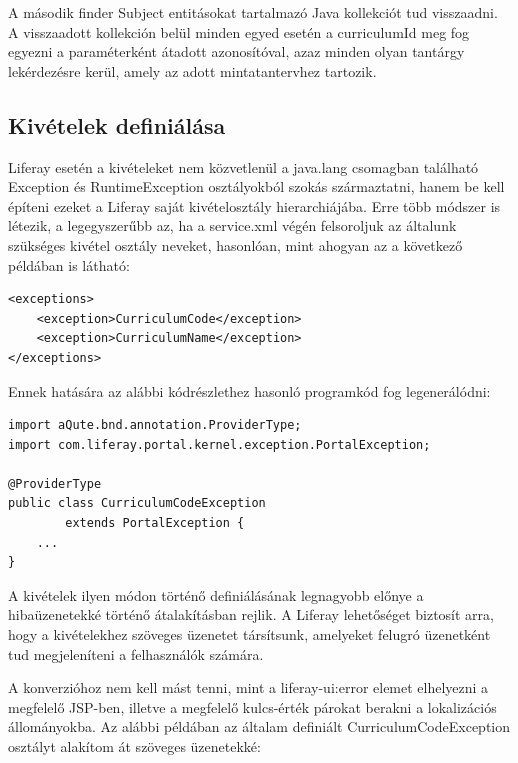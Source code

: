 \documentclass[hidelinks, 12pt, a4paper]{report}
\begin{document}
A második finder Subject entitásokat tartalmazó Java kollekciót tud visszaadni. A visszaadott kollekción belül minden egyed esetén a curriculumId meg fog egyezni a paraméterként átadott azonosítóval, azaz minden olyan tantárgy lekérdezésre kerül, amely az adott mintatantervhez tartozik.

\subsection{Kivételek definiálása}

Liferay esetén a kivételeket nem közvetlenül a java.lang csomagban található Exception és RuntimeException osztályokból szokás származtatni, hanem be kell építeni ezeket a Liferay saját kivételosztály hierarchiájába. Erre több módszer is létezik, a legegyszerűbb az, ha a service.xml végén felsoroljuk az általunk szükséges kivétel osztály neveket, hasonlóan, mint ahogyan az a következő példában is látható:

\begin{minipage}{\linewidth}
\begin{lstlisting}
<exceptions>
	<exception>CurriculumCode</exception>
	<exception>CurriculumName</exception>
</exceptions>
\end{lstlisting}
\end{minipage}

Ennek hatására az alábbi kódrészlethez hasonló programkód fog legenerálódni:

\begin{minipage}{\linewidth}
\begin{lstlisting}
import aQute.bnd.annotation.ProviderType;
import com.liferay.portal.kernel.exception.PortalException;

@ProviderType
public class CurriculumCodeException
		extends PortalException {
	...
}
\end{lstlisting}
\end{minipage}

A kivételek ilyen módon történő definiálásának legnagyobb előnye a hibaüzenetekké történő átalakításban rejlik. A Liferay lehetőséget biztosít arra, hogy a kivételekhez szöveges üzenetet társítsunk, amelyeket felugró üzenetként tud megjeleníteni a felhasználók számára.

A konverzióhoz nem kell mást tenni, mint a liferay-ui:error elemet elhelyezni a megfelelő JSP-ben, illetve a megfelelő kulcs-érték párokat berakni a lokalizációs állományokba. Az alábbi példában az általam definiált CurriculumCodeException osztályt alakítom át szöveges üzenetekké:
\end{document}
